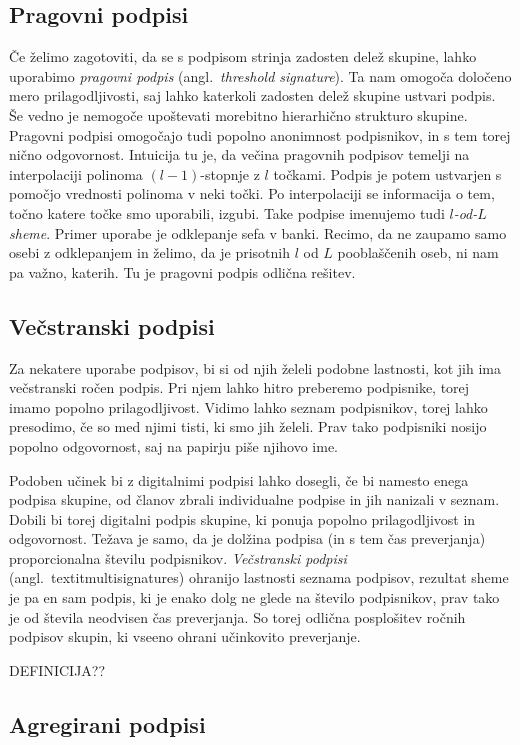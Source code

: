 \documentclass[isrm2, tisk]{fmfdelo}
\begin{document}
\subsection{Pragovni podpisi}
Če želimo zagotoviti, da se s podpisom strinja zadosten delež skupine, lahko uporabimo \textit{pragovni 
podpis} (angl.\ \textit{threshold signature}). Ta nam omogoča določeno mero prilagodljivosti, saj lahko 
katerkoli zadosten delež skupine ustvari podpis. Še vedno je nemogoče upoštevati morebitno hierarhično
strukturo skupine. Pragovni podpisi omogočajo tudi popolno anonimnost podpisnikov, in s tem torej 
nično odgovornost. Intuicija tu je, da večina pragovnih podpisov temelji na interpolaciji polinoma 
$(l - 1)$-stopnje z $l$ točkami. Podpis je potem ustvarjen s pomočjo vrednosti polinoma v neki točki. 
Po interpolaciji se informacija o tem, točno katere točke smo uporabili, izgubi. Take podpise imenujemo 
tudi \textit{$l$-od-$L$ sheme}. Primer uporabe je odklepanje sefa v banki. Recimo, da ne zaupamo samo 
osebi z odklepanjem in želimo, da je prisotnih $l$ od $L$ pooblaščenih oseb, ni nam pa važno, katerih. 
Tu je pragovni podpis odlična rešitev.

\subsection{Večstranski podpisi}
Za nekatere uporabe podpisov, bi si od njih želeli podobne lastnosti, kot jih ima večstranski ročen podpis. 
Pri njem lahko hitro preberemo podpisnike, torej imamo popolno prilagodljivost. Vidimo lahko seznam 
podpisnikov, torej lahko presodimo, če so med njimi tisti, ki smo jih želeli. Prav tako podpisniki nosijo 
popolno odgovornost, saj na papirju piše njihovo ime. 

Podoben učinek bi z digitalnimi podpisi lahko dosegli, če bi namesto enega podpisa skupine, od članov 
zbrali individualne podpise in jih nanizali v seznam. Dobili bi torej digitalni podpis skupine, ki 
ponuja popolno prilagodljivost in odgovornost. Težava je samo, da je dolžina podpisa (in s tem čas 
preverjanja) proporcionalna številu podpisnikov. \textit{Večstranski podpisi} (angl.\ textit{multisignatures})
ohranijo lastnosti seznama podpisov, rezultat sheme je pa en sam podpis, ki je enako dolg ne glede 
na število podpisnikov, prav tako je od števila neodvisen čas preverjanja. So torej odlična posplošitev 
ročnih podpisov skupin, ki vseeno ohrani učinkovito preverjanje.

DEFINICIJA??

\subsection{Agregirani podpisi}
\end{document}
